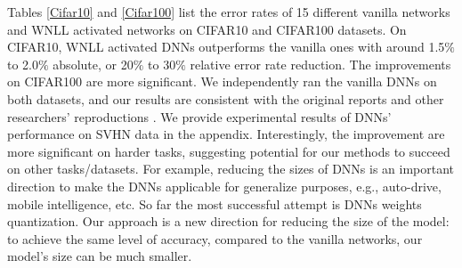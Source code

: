 \documentclass{article}
\begin{document}
Tables \ref{Cifar10} and \ref{Cifar100} list the error rates of 15 different vanilla networks and WNLL activated networks on CIFAR10 and CIFAR100 datasets. On CIFAR10, WNLL activated DNNs outperforms the vanilla ones with around 1.5$\%$ to 2.0$\%$ absolute, or 20$\%$ to 30$\%$ relative error rate reduction. The improvements on CIFAR100 are more significant. We independently ran the vanilla DNNs on both datasets, and our results are consistent with the original reports and other researchers' reproductions \cite{DRN:2016,IdentityMap:2016,Huang:2017CVPR}. We provide experimental results of DNNs' performance on SVHN data in the appendix. Interestingly, the improvement are more significant on harder tasks, suggesting potential for our methods to succeed on other tasks/datasets. For example, reducing the sizes of DNNs is an important direction to make the DNNs applicable for generalize purposes, e.g., auto-drive, mobile intelligence, etc. So far the most successful attempt is DNNs weights quantization\cite{BinaryConnect:2015}. Our approach is a new direction for reducing the size of the model: to achieve the same level of accuracy, compared to the vanilla networks, our model's size can be much smaller. 


\begin{table}[!h]
\renewcommand{\arraystretch}{1.3}
\centering
\caption{Error rates of the vanilla DNNs v.s. the WNLL activated DNNs over the whole CIFAR100 dataset. (Median of 5 independent trials)}
\label{Cifar100}
\centering
{}
\end{table}
\end{document}
